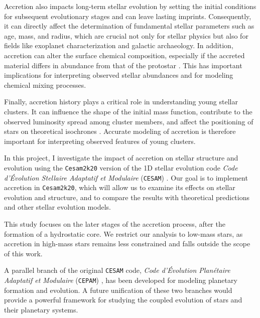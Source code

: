 \documentclass[12pt,a4paper]{article}
\begin{document}
Accretion also impacts long-term stellar evolution by setting the initial conditions for subsequent evolutionary stages and can leave lasting imprints. Consequently, it can directly affect the determination of fundamental stellar parameters such as age, mass, and radius, which are crucial not only for stellar physics but also for fields like exoplanet characterization and galactic archaeology. In addition, accretion can alter the surface chemical composition, especially if the accreted material differs in abundance from that of the protostar \parencite{KunitomoGuillot2021}. This has important implications for interpreting observed stellar abundances and for modeling chemical mixing processes.

Finally, accretion history plays a critical role in understanding young stellar clusters. It can influence the shape of the initial mass function, contribute to the observed luminosity spread among cluster members, and affect the positioning of stars on theoretical isochrones \parencite{BaraffeEtAl2009,BaraffeEtAl2012,HosokawaEtAl2011}. Accurate modeling of accretion is therefore important for interpreting observed features of young clusters.

In this project, I investigate the impact of accretion on stellar structure and evolution using the \texttt{Cesam2k20} version of the 1D stellar evolution code \textit{Code d'Évolution Stellaire Adaptatif et Modulaire} (\texttt{CESAM}) \parencite{Morel1997,MorelLebreton2008,MarquesEtAl2013}. Our goal is to implement accretion in \texttt{Cesam2k20}, which will allow us to examine its effects on stellar evolution and structure, and to compare the results with theoretical predictions and other stellar evolution models.

This study focuses on the later stages of the accretion process, after the formation of a hydrostatic core. We restrict our analysis to low-mass stars, as accretion in high-mass stars remains less constrained and falls outside the scope of this work.

A parallel branch of the original \texttt{CESAM} code, \textit{Code d'Évolution Planétaire Adaptatif et Modulaire} (\texttt{CEPAM}) \parencite{GuillotMorel1995}, has been developed for modeling planetary formation and evolution. A future unification of these two branches would provide a powerful framework for studying the coupled evolution of stars and their planetary systems.
\end{document}
